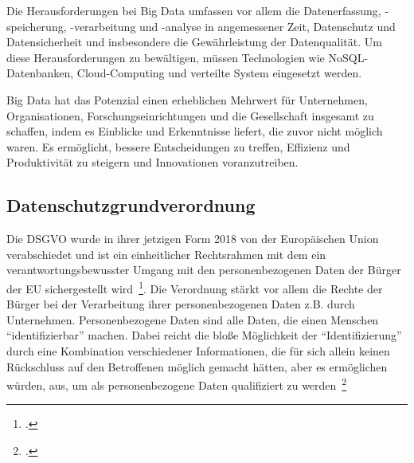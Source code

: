 Die Herausforderungen bei Big Data umfassen vor allem die Datenerfassung, -speicherung, -verarbeitung und -analyse in angemessener Zeit, Datenschutz und Datensicherheit und insbesondere die Gewährleistung der 
Datenqualität. Um diese Herausforderungen zu bewältigen, müssen Technologien wie NoSQL-Datenbanken, Cloud-Computing und verteilte System eingesetzt werden.

Big Data hat das Potenzial einen erheblichen Mehrwert für Unternehmen, Organisationen, Forschungseinrichtungen und die Gesellschaft insgesamt zu schaffen, indem es Einblicke und Erkenntnisse liefert, 
die zuvor nicht möglich waren. Es ermöglicht, bessere Entscheidungen zu treffen, Effizienz und Produktivität zu steigern und Innovationen voranzutreiben.

\subsection{Datenschutzgrundverordnung}

Die \ac{DSGVO} wurde in ihrer jetzigen Form 2018 von der Europäischen Union verabschiedet und ist ein einheitlicher Rechtsrahmen mit dem ein verantwortungsbewusster Umgang
mit den personenbezogenen Daten der Bürger der \ac{EU} sichergestellt wird~\footcite[\vglf][]{Voigt.2018}.
Die Verordnung stärkt vor allem die Rechte der Bürger bei der Verarbeitung ihrer personenbezogenen Daten z.B. durch Unternehmen. Personenbezogene Daten sind alle Daten, die einen Menschen
\enquote{identifizierbar} machen. Dabei reicht die bloße Möglichkeit der \enquote{Identifizierung} durch eine Kombination verschiedener Informationen, 
die für sich allein keinen Rückschluss 
auf den Betroffenen möglich gemacht hätten, aber es ermöglichen würden, aus, um als personenbezogene Daten qualifiziert zu werden~\footcite[\vglf][]{Voigt.2018}

